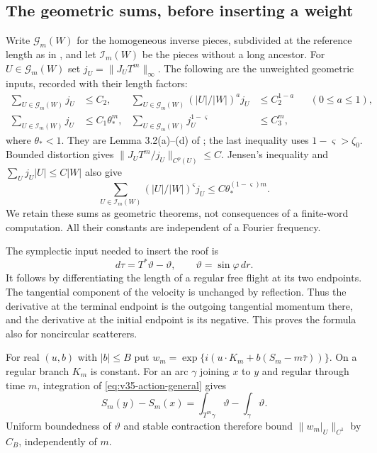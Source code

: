 \subsection{The geometric sums, before inserting a weight}
Write $\mathcal G_m(W)$ for the homogeneous inverse pieces, subdivided
at the reference length as in \cite[Section 3.2]{DZ}, and let
$\mathcal I_m(W)$ be the pieces without a long ancestor. For
$U\in\mathcal G_m(W)$ set
$j_U=\|J_UT^m\|_\infty$. The following are the unweighted geometric
inputs, recorded with their length factors:
\begin{align}
 \sum_{U\in\mathcal G_m(W)}j_U&\le C_2,&
 \sum_{U\in\mathcal G_m(W)}
                 (|U|/|W|)^a j_U&\le C_2^{1-a}
                   &&(0\le a\le1),                 \label{eq:v35-geometric-sums-a}\\
 \sum_{U\in\mathcal I_m(W)}j_U&\le C_1\theta_*^m,&
 \sum_{U\in\mathcal G_m(W)}j_U^{1-\varsigma}&\le C_3^m,
                                                        \label{eq:v35-geometric-sums-b}
\end{align}
where $\theta_*<1$. They are Lemma 3.2(a)--(d) of \cite{DZ}; the
last inequality uses $1-\varsigma>\zeta_0$. Bounded distortion gives
$\|J_UT^m/j_U\|_{C^p(U)}\le C$. Jensen's inequality and
$\sum_U j_U|U|\le C|W|$ also give
\begin{equation}\label{eq:v35-never-long-length-sum}
 \sum_{U\in\mathcal I_m(W)}(|U|/|W|)^{\varsigma}j_U
                         \le C\theta_*^{(1-\varsigma)m}.
\end{equation}
We retain these sums as geometric theorems, not consequences of a
finite-word computation. All their constants are independent of a
Fourier frequency.

The symplectic input needed to insert the roof is
\begin{equation}\label{eq:v35-action-general}
 d\tau=T^*\vartheta-\vartheta,\qquad \vartheta=\sin\varphi\,dr.
\end{equation}
It follows by differentiating the length of a regular free flight at
its two endpoints. The tangential component of the velocity is unchanged
by reflection. Thus the derivative at the terminal endpoint is the
outgoing tangential momentum there, and the derivative at the initial
endpoint is its negative. This proves the formula also for noncircular
scatterers.

For real $(u,b)$ with $|b|\le B$ put
$w_m=\exp\{i(u\cdot K_m+b(S_m-m\bar\tau))\}$.
On a regular branch $K_m$ is constant. For an arc $\gamma$ joining
$x$ to $y$ and regular through time $m$, integration of
\eqref{eq:v35-action-general} gives
\begin{equation}\label{eq:v35-action-telescope}
 S_m(y)-S_m(x)=\int_{T^m\gamma}\vartheta-\int_\gamma\vartheta.
\end{equation}
Uniform boundedness of $\vartheta$ and stable contraction therefore
bound $\|w_m|_U\|_{C^1}$ by $C_B$, independently of $m$.

